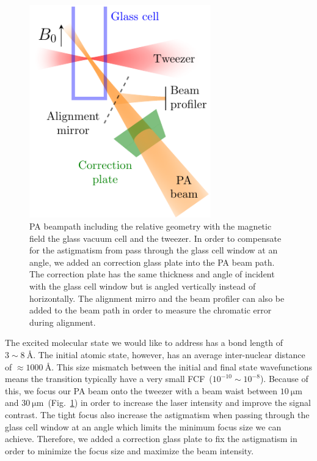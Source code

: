 \begin{figure}
  \centering
  \includegraphics[width=0.7\textwidth]{figures/pa_beampath.pdf}
  \caption[PA beampath]{
    PA beampath including the relative geometry with the magnetic field
    the glass vacuum cell and the tweezer.
    In order to compensate for the astigmatism from pass through the glass cell window
    at an angle, we added an correction glass plate into the PA beam path.
    The correction plate has the same thickness and angle of incident with the glass cell window
    but is angled vertically instead of horizontally.
    The alignment mirro and the beam profiler can also be added to the beam path
    in order to measure the chromatic error during alignment.
    \label{fig:pa:beampath}}
\end{figure}

The excited molecular state we would like to address has a bond length of $3\sim8~\text{\AA}$.
The initial atomic state, however, has an average inter-nuclear distance of
$\approx\!1000~\text{\AA}$.
This size mismatch between the initial and final state wavefunctions
means the transition typically have a very small FCF~($10^{-10}\sim10^{-8}$).
Because of this, we focus our PA beam onto the tweezer with a beam waist between
$10~\mathrm{\mu m}$ and $30~\mathrm{\mu m}$~(Fig.~\ref{fig:pa:beampath}) in order to
increase the laser intensity and improve the signal contrast.
The tight focus also increase the astigmatism when passing through
the glass cell window at an angle which limits the minimum focus size we can achieve.
Therefore, we added a correction glass plate to fix the astigmatism
in order to minimize the focus size and maximize the beam intensity.

